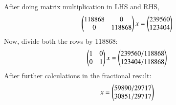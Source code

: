 \documentclass[journal,12pt,twocolumn]{IEEEtran}
\begin{document}
After doing matrix multiplication in LHS and RHS,
\begin{align}
\begin{pmatrix}118868 & 0 \\ 0 & 118868\end{pmatrix}x =
\begin{pmatrix}239560 \\ 123404\end{pmatrix}
\end{align}
Now, divide both the rows by 118868:
\begin{align}
\begin{pmatrix}1 & 0 \\ 0 & 1\end{pmatrix}x =
\begin{pmatrix}239560/118868 \\ 123404/118868\end{pmatrix}
\end{align}
After further calculations in the fractional result:
\begin{align}
x =\begin{pmatrix}59890/29717 \\ 30851/29717\end{pmatrix}
\end{align}
\end{document}
